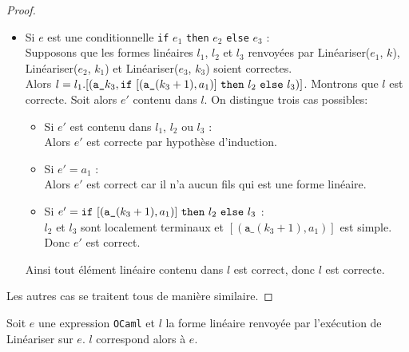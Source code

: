 \begin{proof}
\begin{itemize}
        \item Si $e$ est une conditionnelle \texttt{if} $e_1$ \texttt{then} $e_2$ \texttt{else} $e_3$ : \\
              Supposons que les formes linéaires $l_1$, $l_2$ et $l_3$ renvoyées
              par Linéariser($e_1$, $k$), Linéariser($e_2$, $k_1$) et
              Linéariser($e_3$, $k_3$) soient correctes. \\
              Alors $l = l_1.[(\texttt{a\_}k_3, \textnormal{\texttt{if}}\ [(\texttt{a\_}(k_3 + 1), a_1)]\ \textnormal{\texttt{then}}\ l_2\ \textnormal{\texttt{else}}\ l_3)]$.
              Montrons que $l$ est correcte. Soit alors $e'$ contenu dans $l$.
              On distingue trois cas possibles:
              \begin{itemize}
                  \item Si $e'$ est contenu dans $l_1$, $l_2$ ou $l_3$ : \\
                        Alors $e'$ est correcte par hypothèse d'induction.
                  \item Si $e' = a_1$ : \\
                        Alors $e'$ est correct car il n'a aucun fils qui est une
                        forme linéaire.
                  \item Si $e' = \textnormal{\texttt{if}}\ [(\texttt{a\_}(k_3 + 1), a_1)]\ \textnormal{\texttt{then}}\ l_2\ \textnormal{\texttt{else}}\ l_3$ : \\
                        $l_2$ et $l_3$ sont localement terminaux et
                        $[(\texttt{a\_}(k_3 + 1), a_1)]$ est simple. Donc $e'$
                        est correct.
              \end{itemize}
              Ainsi tout élément linéaire contenu dans $l$ est correct, donc $l$
              est correcte.
    \end{itemize}

    Les autres cas se traitent tous de manière similaire.
\end{proof}

\begin{proposition}
    Soit $e$ une expression \texttt{OCaml} et $l$ la forme linéaire renvoyée par
    l'exécution de Linéariser sur $e$. $l$ correspond alors à $e$.
\end{proposition}

